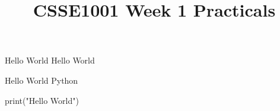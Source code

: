 \documentclass[week1]{csse1001}
\title{CSSE1001 Week 1 Practicals}
\begin{document}
\begin{frame} 
\maketitle
\end{frame}

\begin{topic}{Hello World}
Hello World
\end{topic}

\begin{topic}{Hello World Python}
\begin{python}
print("Hello World")
\end{python}
\end{topic}
\end{document}
